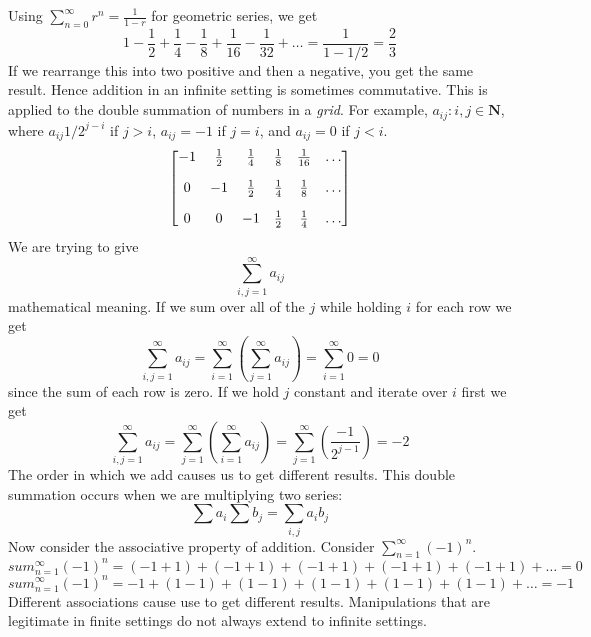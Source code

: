     Using $\sum_{n=0}^\infty r^n = \frac{1}{1 - r}$ for geometric series, we get
    \begin{equation*}
        1 - \frac{1}{2} + \frac{1}{4} - \frac{1}{8} + \frac{1}{16} - \frac{1}{32} + \dots = \frac{1}{1 - 1/2} = \frac{2}{3}
    \end{equation*}
    If we rearrange this into two positive and then a negative, you get the same result. Hence addition in an infinite setting is sometimes commutative.
    \newline \indent
    This is applied to the double summation of numbers in a \textit{grid}. For example, ${a_{ij}: i, j \in \textbf{N}}$, where $a_{ij} 1/2^{j - i}$ if $j > i$, $a_{ij} = -1$ if $j = i$, and $a_{ij} = 0$ if $j < i$.
    $$
        \mqty[
            -1 & \frac{1}{2} & \frac{1}{4} & \frac{1}{8} & \frac{1}{16} & \dots \\[10pt]
            0 & -1 & \frac{1}{2} & \frac{1}{4} & \frac{1}{8} & \dots \\[10pt]
            0 & 0 & -1 & \frac{1}{2} & \frac{1}{4} & \dots
        ]
    $$
    We are trying to give
    \begin{equation*}
        \sum_{i,j=1}^\infty a_{ij}
    \end{equation*}
    mathematical meaning. If we sum over all of the $j$ while holding $i$ for each row we get
    \begin{equation*}
        \sum_{i,j=1}^\infty a_{ij} = \sum_{i=1}^\infty(\sum_{j=1}^\infty a_{ij}) = \sum_{i=1}^\infty 0 = 0
    \end{equation*}
    since the sum of each row is zero. If we hold $j$ constant and iterate over $i$ first we get
    \begin{equation*}
        \sum_{i,j=1}^\infty a_{ij} = \sum_{j=1}^\infty(\sum_{i=1}^\infty a_{ij}) = \sum_{j=1}^\infty (\frac{-1}{2^{j-1}}) = -2
    \end{equation*}
    The order in which we add causes us to get different results. This double summation occurs when we are multiplying two series:
    \begin{equation*}
        \sum a_i \sum b_j = \sum_{i,j} a_ib_j
    \end{equation*}
    Now consider the associative property of addition. Consider $\sum_{n=1}^\infty (-1)^n$.
    \begin{equation*}
        sum_{n=1}^\infty (-1)^n = (-1 + 1) + (-1 + 1) + (-1 + 1) + (-1 + 1) + (-1 + 1) + \dots = 0
    \end{equation*}
    \begin{equation*}
        sum_{n=1}^\infty (-1)^n = -1 +(1 - 1) + (1 - 1) + (1 - 1) + (1 - 1) + (1 - 1) + \dots = -1
    \end{equation*}
    Different associations cause use to get different results. Manipulations that are legitimate in finite settings do not always extend to infinite settings.